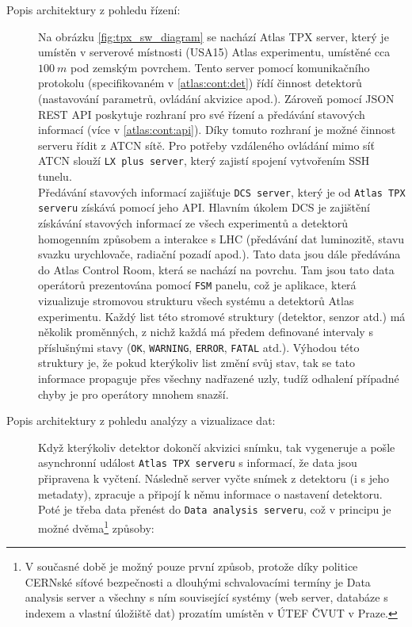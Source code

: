 \begin{description}
	\item[Popis architektury z pohledu řízení:] 
		Na obrázku \ref{fig:tpx_sw_diagram} se nachází Atlas TPX server, který je umístěn v serverové místnosti (USA15) Atlas experimentu, umístěné cca $100~m$ pod zemským povrchem. Tento server pomocí komunikačního protokolu (specifikovaném v \ref{atlas:cont:det}) řídí činnost detektorů (nastavování parametrů, ovládání akvizice apod.). Zároveň pomocí JSON REST API poskytuje rozhraní pro své řízení a předávání stavových informací (více v \ref{atlas:cont:api}). Díky tomuto rozhraní je možné činnost serveru řídit z ATCN sítě. Pro potřeby vzdáleného ovládání mimo síť ATCN slouží \texttt{LX plus server}, který zajistí spojení vytvořením SSH tunelu.\\
		Předávání stavových informací zajišťuje \texttt{DCS server}, který je od \texttt{Atlas TPX serveru} získává pomocí jeho API. Hlavním úkolem DCS je zajištění získávání stavových informací ze všech experimentů a detektorů homogenním způsobem a interakce s LHC (předávání dat luminozitě, stavu svazku urychlovače, radiační pozadí apod.). Tato data jsou dále předávána do Atlas Control Room, která se nachází na povrchu. Tam jsou tato data operátorů prezentována pomocí \texttt{FSM} panelu, což je aplikace, která vizualizuje stromovou strukturu všech systému a detektorů Atlas experimentu. Každý list této stromové struktury (detektor, senzor atd.) má několik proměnných, z nichž každá má předem definované intervaly s příslušnými stavy (\texttt{OK}, \texttt{WARNING}, \texttt{ERROR}, \texttt{FATAL} atd.). Výhodou této struktury je, že pokud kterýkoliv list změní svůj stav, tak se tato informace propaguje přes všechny nadřazené uzly, tudíž odhalení případné chyby je pro operátory mnohem snazší.
	\item[Popis architektury z pohledu analýzy a vizualizace dat:] 
		Když kterýkoliv detektor dokončí akvizici snímku, tak vygeneruje a pošle asynchronní událost \texttt{Atlas TPX serveru} s informací, že data jsou připravena k vyčtení. Následně server vyčte snímek z detektoru (i s jeho metadaty), zpracuje a připojí k němu informace o nastavení detektoru. Poté je třeba data přenést do \texttt{Data analysis serveru}, což v principu je možné dvěma\footnote{V současné době je možný pouze první způsob, protože díky politice CERNské síťové bezpečnosti a dlouhými schvalovacími termíny je Data analysis server a všechny s ním související systémy (web server, databáze s indexem a vlastní úložiště dat) prozatím umístěn v ÚTEF ČVUT v Praze.} způsoby:

\end{description}
